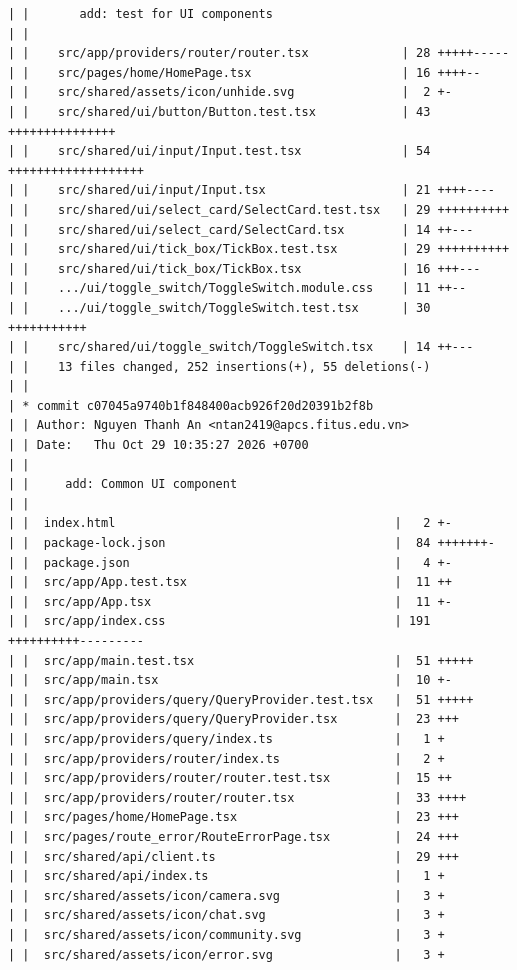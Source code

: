 \documentclass[12pt]{article}
\begin{document}
\begin{lstlisting}[numbers=none,breaklines=true]
| |       add: test for UI components
| |
| |    src/app/providers/router/router.tsx             | 28 +++++-----
| |    src/pages/home/HomePage.tsx                     | 16 ++++--
| |    src/shared/assets/icon/unhide.svg               |  2 +-
| |    src/shared/ui/button/Button.test.tsx            | 43 +++++++++++++++
| |    src/shared/ui/input/Input.test.tsx              | 54 +++++++++++++++++++
| |    src/shared/ui/input/Input.tsx                   | 21 ++++----
| |    src/shared/ui/select_card/SelectCard.test.tsx   | 29 ++++++++++
| |    src/shared/ui/select_card/SelectCard.tsx        | 14 ++---
| |    src/shared/ui/tick_box/TickBox.test.tsx         | 29 ++++++++++
| |    src/shared/ui/tick_box/TickBox.tsx              | 16 +++---
| |    .../ui/toggle_switch/ToggleSwitch.module.css    | 11 ++--
| |    .../ui/toggle_switch/ToggleSwitch.test.tsx      | 30 +++++++++++
| |    src/shared/ui/toggle_switch/ToggleSwitch.tsx    | 14 ++---
| |    13 files changed, 252 insertions(+), 55 deletions(-)
| |
| * commit c07045a9740b1f848400acb926f20d20391b2f8b
| | Author: Nguyen Thanh An <ntan2419@apcs.fitus.edu.vn>
| | Date:   Thu Oct 29 10:35:27 2026 +0700
| |
| |     add: Common UI component
| |
| |  index.html                                       |   2 +-
| |  package-lock.json                                |  84 +++++++-
| |  package.json                                     |   4 +-
| |  src/app/App.test.tsx                             |  11 ++
| |  src/app/App.tsx                                  |  11 +-
| |  src/app/index.css                                | 191 ++++++++++---------
| |  src/app/main.test.tsx                            |  51 +++++
| |  src/app/main.tsx                                 |  10 +-
| |  src/app/providers/query/QueryProvider.test.tsx   |  51 +++++
| |  src/app/providers/query/QueryProvider.tsx        |  23 +++
| |  src/app/providers/query/index.ts                 |   1 +
| |  src/app/providers/router/index.ts                |   2 +
| |  src/app/providers/router/router.test.tsx         |  15 ++
| |  src/app/providers/router/router.tsx              |  33 ++++
| |  src/pages/home/HomePage.tsx                      |  23 +++
| |  src/pages/route_error/RouteErrorPage.tsx         |  24 +++
| |  src/shared/api/client.ts                         |  29 +++
| |  src/shared/api/index.ts                          |   1 +
| |  src/shared/assets/icon/camera.svg                |   3 +
| |  src/shared/assets/icon/chat.svg                  |   3 +
| |  src/shared/assets/icon/community.svg             |   3 +
| |  src/shared/assets/icon/error.svg                 |   3 +

\end{lstlisting}
\end{document}
